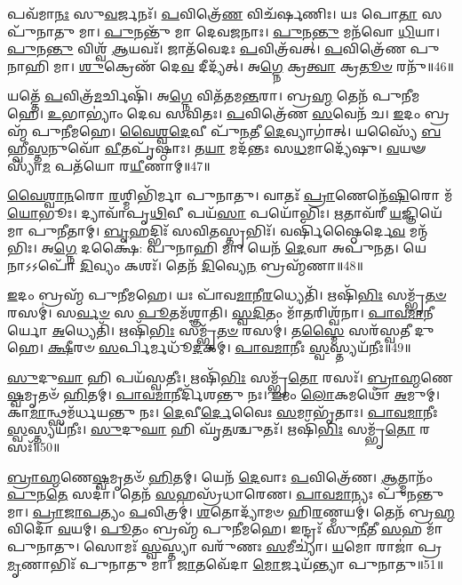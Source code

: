 𑌪𑌵᳴𑌮𑌾\-\ul{𑌨𑌃} 𑌸𑍁\-\ul{𑌵}\-𑌰𑍍𑌜𑌨𑌃᳴।
\-\ul{𑌪}\-𑌵𑌿𑌤𑍍𑌰𑍇᳴\-\ul{𑌣} 𑌵𑌿𑌚᳴𑌰𑍍\mbox{}𑌷𑌣𑌿𑌃।
𑌯𑌃 𑌪𑍋\-\ul{𑌤𑌾} 𑌸 𑌪𑍁᳴𑌨𑌾𑌤𑍁 𑌮𑌾।
\-\ul{𑌪𑍁}\-𑌨𑌨𑍍𑌤𑍁᳴ 𑌮𑌾 𑌦𑍇𑌵\-\ul{𑌜}\-𑌨𑌾𑌃।
\-\ul{𑌪𑍁}\-𑌨\-\ul{𑌨𑍍𑌤𑍁} 𑌮𑌨᳴𑌵𑍋 \ul{𑌧𑌿}\-𑌯𑌾।
\-\ul{𑌪𑍁}\-𑌨\-\ul{𑌨𑍍𑌤𑍁} 𑌵𑌿𑌶𑍍𑌵᳴ \ul{𑌆}\-𑌯𑌵𑌃᳴।
𑌜𑌾𑌤᳴𑌵𑍇𑌦𑌃 \ul{𑌪}\-𑌵𑌿𑌤𑍍𑌰᳴𑌵𑌤𑍍।
\-\ul{𑌪}\-𑌵𑌿𑌤𑍍𑌰𑍇᳴𑌣 𑌪𑍁𑌨𑌾𑌹𑌿 𑌮𑌾।
\-\ul{𑌶𑍁}\-𑌕𑍍𑌰𑍇𑌣᳴ 𑌦𑍇\-\ul{𑌵} 𑌦𑍀𑌦𑍍𑌯᳴𑌤𑍍।
𑌅\-\ul{𑌗𑍍𑌨𑍇} 𑌕𑍍𑌰\-\ul{𑌤𑍍𑌵𑌾} 𑌕𑍍𑌰\-\ul{𑌤𑍂}\-\-\ul{𑍞} 𑌰𑌨𑍁᳴\-॥46॥

𑌯𑌤𑍍𑌤𑍇᳴ \ul{𑌪}\-𑌵𑌿𑌤𑍍𑌰᳴\-\ul{𑌮}\-𑌰𑍍𑌚𑌿𑌷𑌿᳴।
𑌅\-\ul{𑌗𑍍𑌨𑍇} 𑌵𑌿𑌤᳴𑌤𑌮\-\ul{𑌨𑍍𑌤}\-𑌰𑌾।
𑌬𑍍𑌰\-\ul{𑌹𑍍𑌮} 𑌤𑍇𑌨᳴ 𑌪𑍁𑌨𑍀𑌮𑌹𑍇।
\-\ul{𑌉}\-𑌭𑌾𑌭𑍍𑌯𑌾𑌂॑ 𑌦𑍇𑌵 𑌸𑌵𑌿𑌤𑌃।
\-\ul{𑌪}\-𑌵𑌿𑌤𑍍𑌰𑍇᳴𑌣 \ul{𑌸}\-𑌵𑍇𑌨᳴ 𑌚।
\-\ul{𑌇}\-𑌦𑌂 𑌬𑍍𑌰𑌹𑍍𑌮᳴ 𑌪𑍁𑌨𑍀𑌮𑌹𑍇।
\-\ul{𑌵𑍈}\-\-\ul{𑌶𑍍𑌵}\-\-\ul{𑌦𑍇}\-𑌵𑍀 𑌪𑍁᳴\-\ul{𑌨}\-𑌤𑍀 \ul{𑌦𑍇}\-𑌵𑍍𑌯𑌾𑌗𑌾॑𑌤𑍍।
𑌯𑌸𑍍𑌯𑍈᳴ \ul{𑌬}\-𑌹𑍍𑌵𑍀\-\ul{𑌸𑍍𑌤}\-𑌨𑍁𑌵𑍋᳴ \ul{𑌵𑍀}\-𑌤𑌪𑍃᳴𑌷𑍍𑌠𑌾𑌃।
𑌤\-\ul{𑌯𑌾} 𑌮𑌦᳴𑌨𑍍𑌤𑌃 𑌸\-\ul{𑌧}\-𑌮𑌾𑌦𑍍𑌯𑍇᳴𑌷𑍁।
\-\ul{𑌵}\-𑌯𑍟 𑌸𑍍𑌯𑌾᳴\-\ul{𑌮} 𑌪𑌤᳴𑌯𑍋 𑌰\-\ul{𑌯𑍀}\-𑌣𑌾𑌮𑍍॥47॥

\-\ul{𑌵𑍈}\-\-\ul{𑌶𑍍𑌵𑌾}\-\-\ul{𑌨}\-𑌰𑍋 \ul{𑌰}\-𑌶𑍍𑌮𑌿𑌭𑌿᳴𑌰𑍍𑌮𑌾 𑌪𑍁𑌨𑌾𑌤𑍁।
𑌵𑌾𑌤𑌃᳴ \ul{𑌪𑍍𑌰𑌾}\-𑌣𑍇𑌨𑍇᳴\-\ul{𑌷𑌿}\-𑌰𑍋 𑌮᳴\-\ul{𑌯𑍋}\-𑌭𑍂𑌃।
𑌦𑍍𑌯𑌾𑌵𑌾᳴𑌪𑍃\-\ul{𑌥𑌿}\-𑌵𑍀 𑌪𑌯᳴\-\ul{𑌸𑌾} 𑌪𑌯𑍋᳴𑌭𑌿𑌃।
\-\ul{𑌋}\-𑌤𑌾𑌵᳴𑌰𑍀 \ul{𑌯}\-𑌜𑍍𑌞𑌿𑌯𑍇᳴ 𑌮𑌾 𑌪𑍁𑌨𑍀𑌤𑌾𑌮𑍍।
\-\ul{𑌬𑍃}\-𑌹𑌦𑍍𑌭𑌿𑌃᳴ 𑌸𑌵𑌿\-\ul{𑌤}\-𑌸𑍍𑌤𑍃𑌭𑌿𑌃᳴।
𑌵𑌰𑍍\mbox{}𑌷𑌿᳴𑌷𑍍𑌠𑍈𑌰𑍍𑌦𑍇\-\ul{𑌵} 𑌮𑌨𑍍𑌮᳴𑌭𑌿𑌃।
𑌅\-\ul{𑌗𑍍𑌨𑍇} 𑌦𑌕𑍍𑌷𑍈॑: 𑌪𑍁𑌨𑌾𑌹𑌿 𑌮𑌾।
𑌯𑍇𑌨᳴ \ul{𑌦𑍇}\-𑌵𑌾 𑌅𑌪𑍁᳴𑌨𑌤।
𑌯𑍇𑌨𑌾𑌽𑌽𑌪𑍋᳴ \ul{𑌦𑌿}\-𑌵𑍍𑌯𑌂 𑌕𑌶𑌃᳴।
𑌤𑍇𑌨᳴ \ul{𑌦𑌿}\-𑌵𑍍𑌯𑍇\-\ul{𑌨} 𑌬𑍍𑌰𑌹𑍍𑌮᳴𑌣𑌾॥48॥

\-\ul{𑌇}\-𑌦𑌂 𑌬𑍍𑌰𑌹𑍍𑌮᳴ 𑌪𑍁𑌨𑍀𑌮𑌹𑍇।
𑌯𑌃 𑌪𑌾᳴𑌵\-\ul{𑌮𑌾}\-𑌨𑍀\-\ul{𑌰}\-𑌧𑍍𑌯𑍇𑌤𑌿᳴।
𑌋𑌷𑌿᳴\-\ul{𑌭𑌿𑌃} 𑌸𑌮𑍍𑌭𑍃᳴\-\ul{𑌤}\-\-\ul{𑍞} 𑌰𑌸𑌮𑍍॑।
𑌸\-\ul{𑌰𑍍𑌵}\-\-\ul{𑍞} 𑌸 \ul{𑌪𑍂}\-𑌤𑌮᳴𑌶𑍍𑌞𑌾𑌤𑌿।
\-\ul{𑌸𑍍𑌵}\-\-\ul{𑌦𑌿}\-𑌤𑌂 𑌮𑌾᳴\-\ul{𑌤}\-𑌰𑌿𑌶𑍍𑌵᳴𑌨𑌾।
\-\ul{𑌪𑌾}\-\-\ul{𑌵}\-\-\ul{𑌮𑌾}\-𑌨𑍀𑌰𑍍𑌯𑍋 \ul{𑌅}\-𑌧𑍍𑌯𑍇𑌤𑌿᳴।
𑌋𑌷𑌿᳴\-\ul{𑌭𑌿𑌃} 𑌸𑌮𑍍𑌭𑍃᳴\-\ul{𑌤}\-\-\ul{𑍞} 𑌰𑌸𑌮𑍍॑।
𑌤\-\ul{𑌸𑍍𑌮𑍈} 𑌸𑌰᳴𑌸𑍍𑌵𑌤𑍀 𑌦𑍁𑌹𑍇।
\-\ul{𑌕𑍍𑌷𑍀}\-𑌰𑍞 \ul{𑌸}\-𑌰𑍍𑌪𑌿𑌰𑍍𑌮𑌧𑍂᳴\-\ul{𑌦}\-𑌕𑌮𑍍।
\-\ul{𑌪𑌾}\-\-\ul{𑌵}\-\-\ul{𑌮𑌾}\-𑌨𑍀𑌃 \ul{𑌸𑍍𑌵}\-𑌸𑍍𑌤𑍍𑌯𑌯᳴𑌨𑍀𑌃॥49॥

\-\ul{𑌸𑍁}\-𑌦𑍁\-\ul{𑌘𑌾} 𑌹𑌿 𑌪𑌯᳴𑌸𑍍𑌵𑌤𑍀𑌃।
𑌋𑌷𑌿᳴\-\ul{𑌭𑌿𑌃} 𑌸𑌮𑍍𑌭𑍃᳴\-\ul{𑌤𑍋} 𑌰𑌸𑌃᳴।
\-\ul{𑌬𑍍𑌰𑌾}\-\-\ul{𑌹𑍍𑌮}\-𑌣𑍇\-\ul{𑌷𑍍𑌵}\-𑌮𑍃𑌤𑍞᳴ \ul{𑌹𑌿}\-𑌤𑌮𑍍।
\-\ul{𑌪𑌾}\-\-\ul{𑌵}\-\-\ul{𑌮𑌾}\-𑌨𑍀𑌰𑍍𑌦𑌿᳴𑌶𑌨𑍍𑌤𑍁 𑌨𑌃।
\-\ul{𑌇}\-𑌮𑌂 \ul{𑌲𑍋}\-𑌕𑌮𑌥𑍋᳴ \ul{𑌅}\-𑌮𑍁𑌮𑍍।
𑌕𑌾\-\ul{𑌮𑌾}\-𑌨𑍍𑌥𑍍𑌸𑌮᳴𑌰𑍍𑌧𑌯𑌨𑍍𑌤𑍁 𑌨𑌃।
\-\ul{𑌦𑍇}\-𑌵𑍀\-\ul{𑌰𑍍𑌦𑍇}\-𑌵𑍈𑌃 \ul{𑌸}\-𑌮𑌾𑌭𑍃᳴𑌤𑌾𑌃।
\-\ul{𑌪𑌾}\-\-\ul{𑌵}\-\-\ul{𑌮𑌾}\-𑌨𑍀𑌃 \ul{𑌸𑍍𑌵}\-𑌸𑍍𑌤𑍍𑌯𑌯᳴𑌨𑍀𑌃।
\-\ul{𑌸𑍁}\-𑌦𑍁\-\ul{𑌘𑌾} 𑌹𑌿 𑌘𑍃᳴\-\ul{𑌤}\-𑌶𑍍𑌚𑍁𑌤𑌃᳴।
𑌋𑌷𑌿᳴\-\ul{𑌭𑌿𑌃} 𑌸𑌮𑍍𑌭𑍃᳴\-\ul{𑌤𑍋} 𑌰𑌸𑌃᳴॥50॥

\-\ul{𑌬𑍍𑌰𑌾}\-\-\ul{𑌹𑍍𑌮}\-𑌣𑍇\-\ul{𑌷𑍍𑌵}\-𑌮𑍃𑌤𑍞᳴ \ul{𑌹𑌿}\-𑌤𑌮𑍍।
𑌯𑍇𑌨᳴ \ul{𑌦𑍇}\-𑌵𑌾𑌃 \ul{𑌪}\-𑌵𑌿𑌤𑍍𑌰𑍇᳴𑌣।
\-\ul{𑌆}\-𑌤𑍍𑌮𑌾𑌨𑌂᳴ \ul{𑌪𑍁}\-𑌨\-\ul{𑌤𑍇} 𑌸𑌦𑌾॑।
𑌤𑍇𑌨᳴ \ul{𑌸}\-𑌹𑌸𑍍𑌰᳴𑌧𑌾𑌰𑍇𑌣।
\-\ul{𑌪𑌾}\-\-\ul{𑌵}\-\-\ul{𑌮𑌾}\-𑌨𑍍𑌯𑌃 𑌪𑍁᳴𑌨𑌨𑍍𑌤𑍁 𑌮𑌾।
\-\ul{𑌪𑍍𑌰𑌾}\-\-\ul{𑌜𑌾}\-\-\ul{𑌪}\-𑌤𑍍𑌯𑌂 \ul{𑌪}\-𑌵𑌿𑌤𑍍𑌰𑌮𑍍॑।
\-\ul{𑌶}\-𑌤𑍋𑌦𑍍𑌯𑌾᳴𑌮𑍞 𑌹𑌿\-\ul{𑌰}\-𑌣𑍍𑌮𑌯𑌮𑍍॑।
𑌤𑍇𑌨᳴ 𑌬𑍍𑌰\-\ul{𑌹𑍍𑌮}\-𑌵𑌿𑌦𑍋᳴ \ul{𑌵}\-𑌯𑌮𑍍।
\-\ul{𑌪𑍂}\-𑌤𑌂 𑌬𑍍𑌰𑌹𑍍𑌮᳴ 𑌪𑍁𑌨𑍀𑌮𑌹𑍇।
𑌇𑌨𑍍𑌦𑍍𑌰𑌃᳴ 𑌸𑍁\-\ul{𑌨𑍀}\-𑌤𑍀 \ul{𑌸}\-𑌹 𑌮𑌾᳴ 𑌪𑍁𑌨𑌾𑌤𑍁।
𑌸𑍋𑌮𑌃᳴ \ul{𑌸𑍍𑌵}\-𑌸𑍍𑌤𑍍𑌯𑌾 𑌵𑌰𑍁᳴𑌣𑌃 \ul{𑌸}\-𑌮𑍀𑌚𑍍𑌯𑌾॑।
\-\ul{𑌯}\-𑌮𑍋 𑌰𑌾𑌜𑌾॑ 𑌪𑍍𑌰\-\ul{𑌮𑍃}\-𑌣𑌾𑌭𑌿𑌃᳴ 𑌪𑍁𑌨𑌾𑌤𑍁 𑌮𑌾।
\-\ul{𑌜𑌾}\-𑌤𑌵𑍇᳴𑌦𑌾 \ul{𑌮𑍋}\-𑌰𑍍𑌜𑌯᳴𑌨𑍍𑌤𑍍𑌯𑌾 𑌪𑍁𑌨𑌾𑌤𑍁॥51॥\anuvakamend[𑌅𑌨𑍁᳴ 𑌰\-\ul{𑌯𑍀}\-𑌣𑌾𑌂 𑌬𑍍𑌰𑌹𑍍𑌮᳴𑌣𑌾 \ul{𑌸𑍍𑌵}\-𑌸𑍍𑌤𑍍𑌯𑌯᳴𑌨𑍀𑌃 \ul{𑌸𑍁}\-𑌦𑍁\-\ul{𑌘𑌾} 𑌹𑌿 𑌘𑍃᳴\-\ul{𑌤}\-𑌶𑍍𑌚𑍁\-\ul{𑌤} 𑌋𑌷𑌿᳴\-\ul{𑌭𑌿𑌃} 𑌸𑌮𑍍𑌭𑍃᳴\-\ul{𑌤𑍋} 𑌰𑌸𑌃᳴ 𑌪𑍁𑌨𑌾\-\ul{𑌤𑍁} 𑌤𑍍𑌰𑍀𑌣𑌿᳴ 𑌚]

